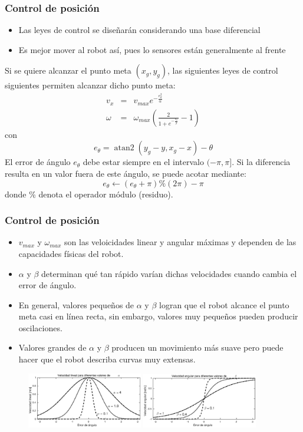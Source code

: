 \documentclass[10pt,spanish,aspectratio=1610]{beamer}
\DeclareMathOperator{\atantwo}{atan2}
\begin{document}
\begin{frame}\frametitle{Control de posición}
  \begin{itemize}
  \item Las leyes de control se diseñarán considerando una base diferencial
  \item Es mejor mover al robot así, pues lo sensores están generalmente al frente
  \end{itemize}
  Si se quiere alcanzar el punto meta $(x_g, y_g)$, las siguientes leyes de control siguientes permiten alcanzar dicho punto meta:
  \begin{eqnarray*}
  v_x    &=& v_{max}e^{-\frac{e_{\theta}^{2}}{\alpha}}\label{eq:Control11}\\
  \omega &=& \omega_{max}\left(\frac{2}{1+e^{-\frac{e_{\theta}}{\beta}}}-1\right)\label{eq:Control12}
  \end{eqnarray*}
  con
  \[e_{\theta} = \atantwo\left(y_g - y, x_g - x\right) - \theta\]
  El error de ángulo $e_\theta$ debe estar siempre en el intervalo $(-\pi, \pi]$. Si la diferencia resulta en un valor fuera de este ángulo, se puede acotar mediante:
  \[e_\theta \leftarrow \left(e_\theta + \pi\right)\% (2\pi) - \pi\]
  donde \% denota el operador módulo (residuo). 
\end{frame}

\begin{frame}\frametitle{Control de posición}
  \begin{itemize}
  \item $v_{max}$ y $\omega_{max}$ son las veloicidades linear y angular máximas y dependen de las capacidades físicas del robot.
  \item $\alpha$ y $\beta$ determinan qué tan rápido varían dichas velocidades cuando cambia el error de ángulo.
  \item En general, valores pequeños de $\alpha$ y $\beta$ logran que el robot alcance el punto meta casi en línea recta, sin embargo, valores muy pequeños pueden producir oscilaciones.
  \item Valores grandes de $\alpha$ y $\beta$ producen un movimiento más suave pero puede hacer que el robot describa curvas muy extensas. 
  \end{itemize}
  \begin{figure}
    \centering
    \includegraphics[width=0.45\textwidth]{Figures/LinearSpeed.eps}
    \includegraphics[width=0.45\textwidth]{Figures/AngularSpeed.eps}
  \end{figure}
\end{frame}
\end{document}
